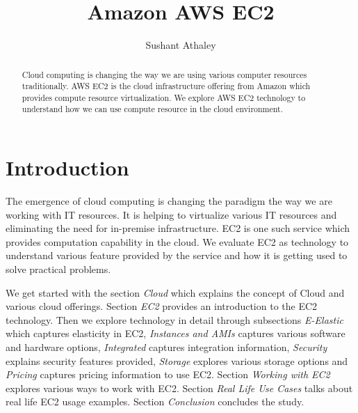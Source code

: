 
\title{Amazon AWS EC2}


\author{Sushant Athaley}

\renewcommand{\shortauthors}{G. v. Laszewski}


\begin{abstract}
Cloud computing is changing the way we are using various computer resources traditionally. AWS EC2 is the cloud infrastructure offering from Amazon which provides compute resource virtualization. We explore AWS EC2 technology to understand how we can use compute resource in the cloud environment. 

\end{abstract}


\maketitle

\section{Introduction}
The emergence of cloud computing is changing the paradigm the way we are working with IT resources. It is helping to virtualize various IT resources and eliminating the need for in-premise infrastructure. EC2 is one such service which provides computation capability in the cloud. We evaluate EC2 as technology to understand various feature provided by the service and how it is getting used to solve practical problems.

We get started with the section \emph{Cloud} which explains the concept of Cloud and various cloud offerings. Section \emph{EC2} provides an introduction to the EC2 technology. Then we explore technology in detail through subsections \emph{E-Elastic} which captures elasticity in EC2, \emph{Instances and AMIs} captures various software and hardware options, \emph{Integrated} captures integration information, \emph{Security} explains security features provided, \emph{Storage} explores various storage options and \emph{Pricing} captures pricing information to use EC2.
Section \emph{Working with EC2} explores various ways to work with EC2. Section \emph{Real Life Use Cases} talks about real life EC2 usage examples. Section \emph{Conclusion} concludes the study. 

